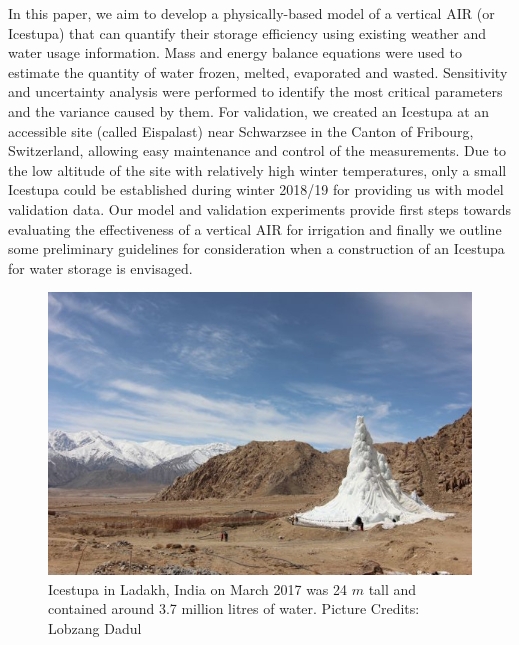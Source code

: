 \documentclass[utf8]{frontiersSCNS} %
\begin{document}
In this paper, we aim to develop a physically-based model of a vertical AIR (or Icestupa) that can quantify their
storage efficiency using existing weather and water usage information. Mass and energy balance equations were used to
estimate the quantity of water frozen, melted, evaporated and wasted. Sensitivity and uncertainty analysis were
performed to identify the most critical parameters and the variance caused by them. For validation, we created an
Icestupa at an accessible site (called Eispalast) near Schwarzsee in the Canton of Fribourg, Switzerland, allowing easy
maintenance and control of the measurements. Due to the low altitude of the site with relatively high winter
temperatures, only a small Icestupa could be established during winter 2018/19 for providing us with model validation
data. Our model and validation experiments provide first steps towards evaluating the effectiveness of a vertical AIR
for irrigation and finally we outline some preliminary guidelines for consideration when a construction of an Icestupa
for water storage is envisaged. 
\begin{figure} \begin{center} \includegraphics[width=10 cm]{Figures/Figure_1.jpg}
\end{center} \caption{Icestupa in Ladakh, India on March 2017 was 24 $m$ tall and contained around 3.7 million litres
of water. Picture Credits: Lobzang Dadul} \label{fig:cone} \end{figure}
\end{document}
